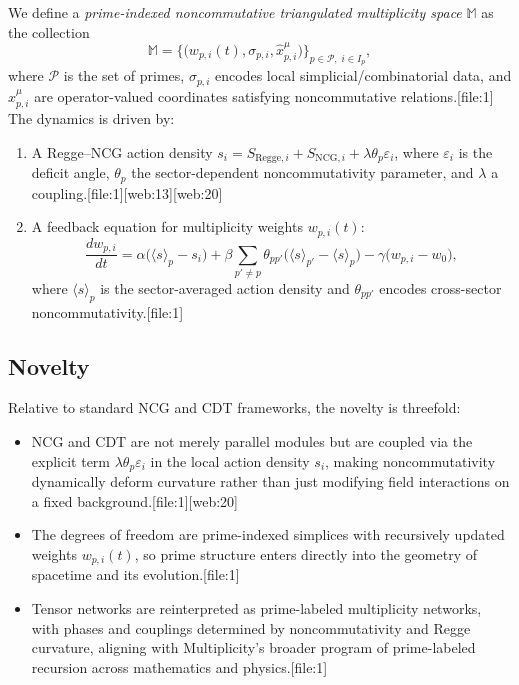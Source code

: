 \documentclass[11pt]{article}
\begin{document}
We define a \emph{prime-indexed noncommutative triangulated multiplicity
space} \(\mathbb{M}\) as the collection
\begin{equation}
  \mathbb{M} =
    \bigl\{ \bigl(w_{p,i}(t), \sigma_{p,i}, \hat{x}^\mu_{p,i} \bigr)
    \bigr\}_{p \in \mathcal{P},\; i \in I_p},
\end{equation}
where \(\mathcal{P}\) is the set of primes, \(\sigma_{p,i}\) encodes local
simplicial/combinatorial data, and \(\hat{x}^\mu_{p,i}\) are operator-valued
coordinates satisfying noncommutative relations.[file:1]
The dynamics is driven by:
\begin{enumerate}[label=(\alph*)]
  \item A Regge--NCG action density
  \(
    s_i = S_{\mathrm{Regge},i} + S_{\mathrm{NCG},i}
         + \lambda \theta_p \varepsilon_i
  \),
  where \(\varepsilon_i\) is the deficit angle, \(\theta_p\) the
  sector-dependent noncommutativity parameter, and \(\lambda\) a coupling.[file:1][web:13][web:20]
  \item A feedback equation for multiplicity weights \(w_{p,i}(t)\):
  \begin{equation}
    \frac{d w_{p,i}}{dt}
      = \alpha\bigl(\langle s \rangle_p - s_i\bigr)
      + \beta \sum_{p' \neq p} \theta_{pp'}
          \bigl(\langle s \rangle_{p'} - \langle s \rangle_p \bigr)
      - \gamma \bigl(w_{p,i} - w_0\bigr),
    \label{eq:feedback}
  \end{equation}
  where \(\langle s \rangle_p\) is the sector-averaged action density and
  \(\theta_{pp'}\) encodes cross-sector noncommutativity.[file:1]
\end{enumerate}

\subsection{Novelty}

Relative to standard NCG and CDT frameworks, the novelty is threefold:
\begin{itemize}
  \item NCG and CDT are not merely parallel modules but are coupled via
        the explicit term \(\lambda \theta_p \varepsilon_i\) in the local
        action density \(s_i\), making noncommutativity dynamically deform
        curvature rather than just modifying field interactions on a fixed
        background.[file:1][web:20]
  \item The degrees of freedom are prime-indexed simplices with
        recursively updated weights \(w_{p,i}(t)\), so prime structure enters
        directly into the geometry of spacetime and its evolution.[file:1]
  \item Tensor networks are reinterpreted as prime-labeled multiplicity
        networks, with phases and couplings determined by noncommutativity
        and Regge curvature, aligning with Multiplicity's broader program of
        prime-labeled recursion across mathematics and physics.[file:1]
\end{itemize}
\end{document}
